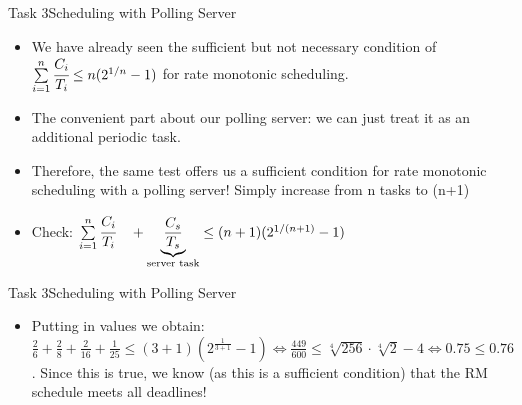 \begin{frame}{Task 3}{Scheduling with Polling Server}
    \begin{solutionnoinc}
    \begin{itemize}
        \item We have already seen the sufficient but not necessary condition of $\sum\limits_{i=1}^{n}\cfrac{C_i}{T_i} \leq n(2^{1/n}-1)$ for rate monotonic scheduling.
        \item The convenient part about our polling server: we can just treat it as an additional \alert{periodic} task.
        \item Therefore, the same test offers us a sufficient condition for rate monotonic scheduling with a polling server! Simply increase from n tasks to (n+1)
        \item Check: $\sum\limits_{i=1}^{n}\cfrac{C_i}{T_i} \quad + \underbrace{\frac{C_s}{T_s}}_{\text{server task}} \leq (n+1)(2^{1/(n+1)}-1)$
    \end{itemize}
    \end{solutionnoinc}
\end{frame}
\begin{frame}{Task 3}{Scheduling with Polling Server}
    \begin{solution}
    \begin{itemize}
      \item \alert{Putting in values we obtain:} $\frac{2}{6} + \frac{2}{8} + \frac{2}{16} + \frac{1}{25} \le (3+1)(2^{\frac{1}{3+1}}-1) \Leftrightarrow \frac{449}{600}\le \sqrt[4]{256}\cdot \sqrt[4]{2} - 4 \Leftrightarrow 0.75 \leq 0.76$. Since this is true, we know (as this is a sufficient condition) that the RM schedule meets all deadlines!
    \end{itemize}
    \end{solution}
\end{frame}
